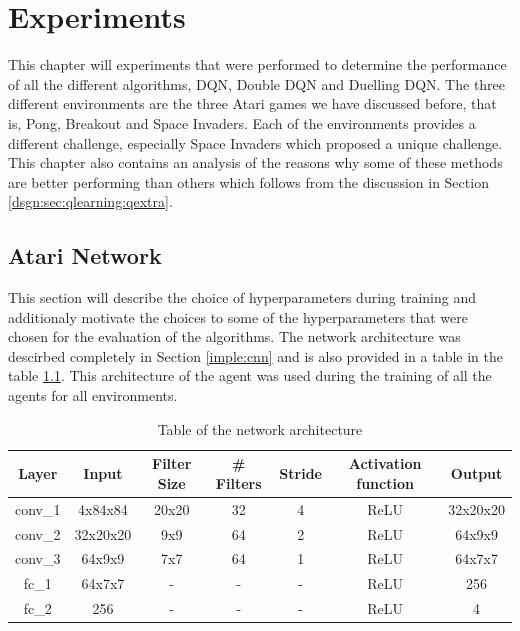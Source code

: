 \chapter{Experiments}
This chapter will experiments that were performed to determine the performance of all the different algorithms, DQN, Double DQN and Duelling DQN. The three different environments are the three Atari games we have discussed before, that is, Pong, Breakout and Space Invaders. Each of the environments provides a different challenge, especially Space Invaders which proposed a unique challenge. This chapter also contains an analysis of the reasons why some of these methods are better performing than others which follows from the discussion in Section \ref{dsgn:sec:qlearning:qextra}.

\section{Atari Network}
This section will describe the choice of hyperparameters during training and additionaly motivate the choices to some of the hyperparameters that were chosen for the evaluation of the algorithms. The network architecture was descirbed completely in Section \ref{imple:cnn} and is also provided in a table in the table \ref{table:network-arch}. This architecture of the agent was used during the training of all the agents for all environments.

\begin{table}[htbp]
  \centering
  \begin{tabular}{|c|c|c|c|c|c|c|}
    \hline
    Layer   & Input    & Filter Size & \# Filters & Stride & Activation function & Output   \\ \hline
    conv\_1 & 4x84x84  & 20x20       & 32         & 4      & ReLU                & 32x20x20 \\
    conv\_2 & 32x20x20 & 9x9         & 64         & 2      & ReLU                & 64x9x9   \\
    conv\_3 & 64x9x9   & 7x7         & 64         & 1      & ReLU                & 64x7x7   \\
    fc\_1   & 64x7x7   & -           & -          & -      & ReLU                & 256      \\
    fc\_2   & 256      & -           & -          & -      & ReLU                & 4        \\ \hline
  \end{tabular}
  \caption{Table of the network architecture
    \label{table:network-arch}
  }
\end{table}

